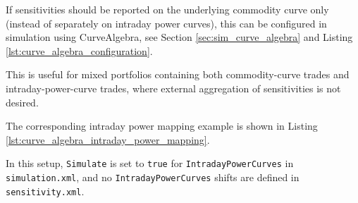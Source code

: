 If sensitivities should be reported on the underlying commodity curve only (instead of separately on intraday
power curves), this can be configured in simulation using CurveAlgebra, see
Section \ref{sec:sim_curve_algebra} and Listing \ref{lst:curve_algebra_configuration}.

This is useful for mixed portfolios containing both commodity-curve trades and intraday-power-curve trades, where
external aggregation of sensitivities is not desired.

The corresponding intraday power mapping example is shown in
Listing \ref{lst:curve_algebra_intraday_power_mapping}.

In this setup, \lstinline!Simulate! is set to \lstinline!true! for \lstinline!IntradayPowerCurves! in
\lstinline!simulation.xml!, and no \lstinline!IntradayPowerCurves! shifts are defined in
\lstinline!sensitivity.xml!.
